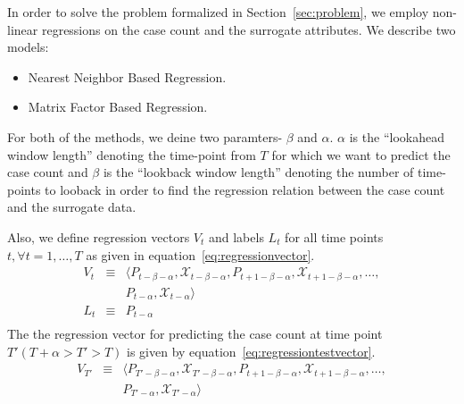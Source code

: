 
In order to solve the problem formalized in Section~\ref{sec:problem}, we employ
non-linear regressions on the case count and the surrogate attributes. 
We describe two models:
\begin{itemize}
  \item Nearest Neighbor Based Regression.
  \item Matrix Factor Based Regression.
\end{itemize}
For both of the methods, we deine two paramters- $\beta$ and $\alpha$. 
$\alpha$ is the ``lookahead window length'' denoting the time-point from $T$ 
for which we want to predict the case count and $\beta$ 
is the ``lookback window length'' denoting the number of time-points to looback
in order to find the regression relation between the case count and the surrogate 
data.

Also, we define regression vectors $V_t$  and 
labels $L_t$ for all time points $t, \forall t = 1,\dots, T$
as given in equation~\ref{eq:regressionvector}.
\begin{equation}
  \label{eq:regressionvector}
  \begin{array}{lcl}
    V_t & \equiv & \langle P_{t-\beta - \alpha}, \mathcal{X}_{t-\beta - \alpha}, P_{t + 1 -\beta-\alpha}, \mathcal{X}_{t + 1 - \beta-\alpha}, \dots, \\
        &        & P_{t-\alpha},\mathcal{X}_{t-\alpha} \rangle \\
    L_t & \equiv & P_{t - \alpha}\\
  \end{array}
\end{equation}
The the regression vector for predicting the case count at time point $T' (T +
\alpha > T' > T)$ is given by equation~\ref{eq:regressiontestvector}.
\begin{equation}
  \label{eq:regressiontestvector}
  \begin{array}{lcl}
    V_{T'} & \equiv & \langle P_{T'-\beta - \alpha}, \mathcal{X}_{T'-\beta - \alpha}, P_{t + 1 -\beta-\alpha}, \mathcal{X}_{t + 1 - \beta-\alpha}, \dots, \\
           &        & P_{T'-\alpha},\mathcal{X}_{T'-\alpha} \rangle \\
  \end{array}
\end{equation}

